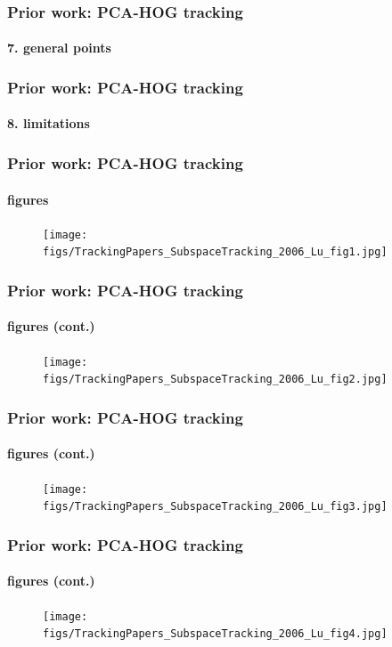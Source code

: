 \begin{frame}
\frametitle{Prior work: PCA-HOG tracking}
\framesubtitle{7. general points}
\logoCSIPCPL\mypagenum
{}
\end{frame}



\begin{frame}
\frametitle{Prior work: PCA-HOG tracking}
\framesubtitle{8. limitations}
\logoCSIPCPL\mypagenum
{}
\end{frame}




\begin{frame}
\frametitle{Prior work: PCA-HOG tracking}
\framesubtitle{figures}
\mypagenum
	\begin{figure}
		\texttt{[image: figs/TrackingPapers\_SubspaceTracking\_2006\_Lu\_fig1.jpg]}
	\end{figure}
\end{frame}




\begin{frame}
\frametitle{Prior work: PCA-HOG tracking}
\framesubtitle{figures (cont.)}
\mypagenum
	\begin{figure}
		\texttt{[image: figs/TrackingPapers\_SubspaceTracking\_2006\_Lu\_fig2.jpg]}
	\end{figure}
\end{frame}


\begin{frame}
\frametitle{Prior work: PCA-HOG tracking}
\framesubtitle{figures (cont.)}
\mypagenum
	\begin{figure}
		\texttt{[image: figs/TrackingPapers\_SubspaceTracking\_2006\_Lu\_fig3.jpg]}
	\end{figure}
\end{frame}




\begin{frame}
\frametitle{Prior work: PCA-HOG tracking}
\framesubtitle{figures (cont.)}
\mypagenum
	\begin{figure}
		\texttt{[image: figs/TrackingPapers\_SubspaceTracking\_2006\_Lu\_fig4.jpg]}
	\end{figure}
\end{frame}




